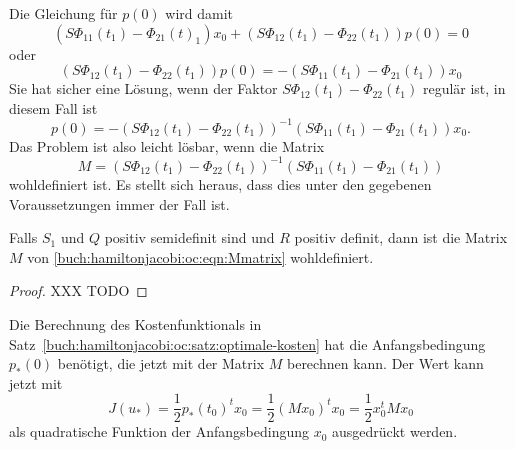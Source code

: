 Die Gleichung für $p(0)$ wird damit
\[
(S\Phi_{11}(t_1)
-\Phi_{21}(t)_1)x_0
+
(S\Phi_{12}(t_1)
-\Phi_{22}(t_1))p(0)
=
0
\]
oder
\[
(S\Phi_{12}(t_1)
-\Phi_{22}(t_1))
p(0)
=
-
(S\Phi_{11}(t_1)
-\Phi_{21}(t_1))
x_0
\]
Sie hat sicher eine Lösung, wenn der Faktor $S\Phi_{12}(t_1)-\Phi_{22}(t_1)$
regulär ist, in diesem Fall ist
\[
p(0)
=
-
(S\Phi_{12}(t_1)
-\Phi_{22}(t_1))^{-1}
(S\Phi_{11}(t_1)
-\Phi_{21}(t_1))
x_0.
\]
Das Problem ist also leicht lösbar, wenn die Matrix
\begin{equation}
M
=
(S\Phi_{12}(t_1)
-\Phi_{22}(t_1))^{-1}
(S\Phi_{11}(t_1)
-\Phi_{21}(t_1))
\label{buch:hamiltonjacobi:oc:eqn:Mmatrix}
\end{equation}
wohldefiniert ist.
Es stellt sich heraus, dass dies unter den gegebenen Voraussetzungen
immer der Fall ist.

\begin{satz}
Falls $S_1$ und $Q$ positiv semidefinit sind und $R$ positiv definit,
dann ist die Matrix $M$ von
\eqref{buch:hamiltonjacobi:oc:eqn:Mmatrix}
wohldefiniert.
\end{satz}

\begin{proof}
XXX TODO
\end{proof}

Die Berechnung des Kostenfunktionals in
Satz~\ref{buch:hamiltonjacobi:oc:satz:optimale-kosten}
hat die Anfangsbedingung $p_*(0)$ benötigt, die jetzt mit der
Matrix $M$ berechnen kann.
Der Wert kann jetzt mit
\[
J(u_*)
=
\frac12 p_*(t_0)^t x_0
=
\frac12 (Mx_0)^t x_0
=
\frac12 x_0^t Mx_0
\]
als quadratische Funktion der Anfangsbedingung $x_0$ ausgedrückt werden.


